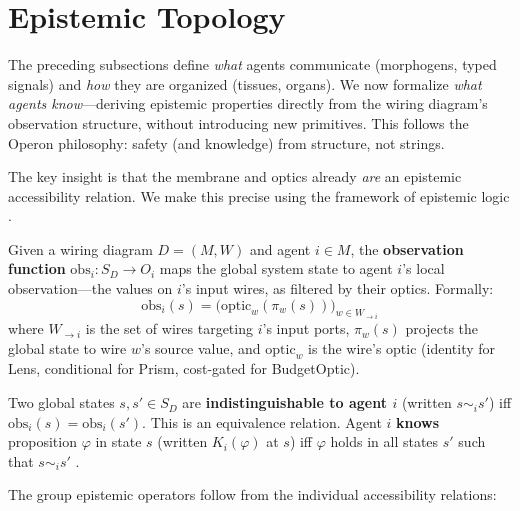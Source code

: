 \section{Epistemic Topology}\label{sec:epistemic-topology-section}

\label{sec:epistemic-topology}

The preceding subsections define \textit{what} agents communicate (morphogens, typed signals) and \textit{how} they are organized (tissues, organs). We now formalize \textit{what agents know}---deriving epistemic properties directly from the wiring diagram's observation structure, without introducing new primitives. This follows the Operon philosophy: safety (and knowledge) from structure, not strings.

The key insight is that the membrane and optics already \textit{are} an epistemic accessibility relation. We make this precise using the framework of epistemic logic \cite{fagin1995reasoning}.

\begin{definition}
\label{def:observation-function}
Given a wiring diagram $D = (M, W)$ and agent $i \in M$, the \textbf{observation function} $\mathrm{obs}_i: S_D \to O_i$ maps the global system state to agent $i$'s local observation---the values on $i$'s input wires, as filtered by their optics. Formally:
\begin{equation}
\mathrm{obs}_i(s) = \bigl(\mathrm{optic}_w(\pi_{w}(s))\bigr)_{w \in W_{\to i}}
\label{eq:observation-function}
\end{equation}
where $W_{\to i}$ is the set of wires targeting $i$'s input ports, $\pi_w(s)$ projects the global state to wire $w$'s source value, and $\mathrm{optic}_w$ is the wire's optic (identity for Lens, conditional for Prism, cost-gated for BudgetOptic).
\end{definition}

\begin{definition}
\label{def:epistemic-indistinguishability}
Two global states $s, s' \in S_D$ are \textbf{indistinguishable to agent $i$} (written $s \sim_i s'$) iff $\mathrm{obs}_i(s) = \mathrm{obs}_i(s')$. This is an equivalence relation. Agent $i$ \textbf{knows} proposition $\varphi$ in state $s$ (written $K_i(\varphi)$ at $s$) iff $\varphi$ holds in all states $s'$ such that $s \sim_i s'$ \cite{fagin1995reasoning}.
\end{definition}

The group epistemic operators follow from the individual accessibility relations:

